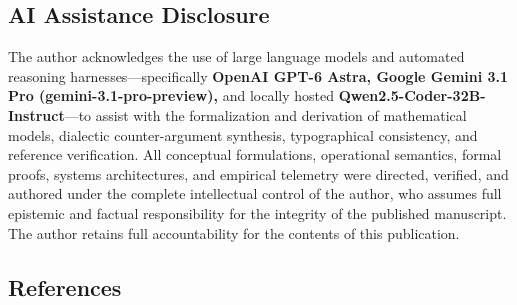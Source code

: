 \documentclass[
  10pt,letterpaper]{article}
\begin{document}
\subsection{AI Assistance Disclosure}\label{ai-assistance-disclosure}

The author acknowledges the use of large language models and automated
reasoning harnesses---specifically \textbf{OpenAI GPT-6 Astra, Google
Gemini 3.1 Pro (gemini-3.1-pro-preview),} and locally hosted
\textbf{Qwen2.5-Coder-32B-Instruct}---to assist with the formalization
and derivation of mathematical models, dialectic counter-argument
synthesis, typographical consistency, and reference verification. All
conceptual formulations, operational semantics, formal proofs, systems
architectures, and empirical telemetry were directed, verified, and
authored under the complete intellectual control of the author, who
assumes full epistemic and factual responsibility for the integrity of
the published manuscript. The author retains full accountability for the
contents of this publication.

\subsection{References}\label{references}
\end{document}
